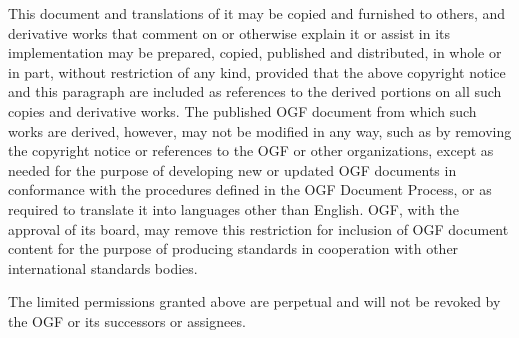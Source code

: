 This document and translations of it may be copied and furnished to others, and derivative works that comment on or otherwise explain it or assist in its implementation may be prepared, copied, published and distributed, in whole or in part, without restriction of any kind, provided that the above copyright notice and this paragraph are included as references to the derived portions on all such copies and derivative works. The published OGF document from which such works are derived, however, may not be modified in any way, such as by removing the copyright notice or references to the OGF or other organizations, except as needed for the purpose of developing new or updated OGF documents in conformance with the procedures defined in the OGF Document Process, or as required to translate it into languages other than English. OGF, with the approval of its board, may remove this restriction for inclusion of OGF document content for the purpose of producing standards in cooperation with other international standards bodies. 

The limited permissions granted above are perpetual and will not be revoked by the OGF or its successors or assignees. 
